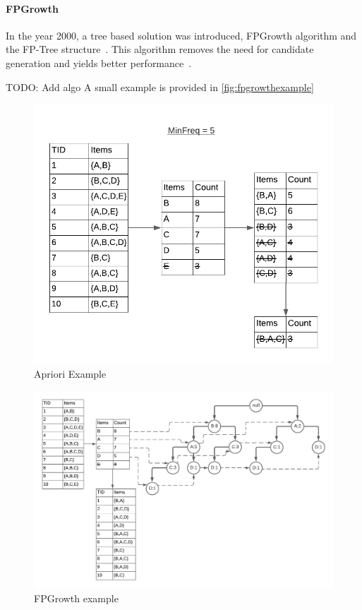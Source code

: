 \paragraph{FPGrowth}
In the year 2000, a tree based solution was introduced, FPGrowth algorithm and the FP-Tree structure~\cite{agrawal1994fast}. This algorithm removes the need for candidate generation and yields better performance~\cite{hunyadi2011performance}. 

TODO: Add algo
A small example is provided in \autoref{fig:fpgrowthexample}

\begin{figure}
  \centering
  \includegraphics[width=\linewidth]{figures/aprioriexample}
  \caption{Apriori Example}
  \label{fig:aprioriexample}
\end{figure}

\begin{figure}
  \centering
  \includegraphics[width=\linewidth]{figures/FPTree}
  \caption{FPGrowth example}
  \label{fig:fpgrowthexample}
\end{figure}

